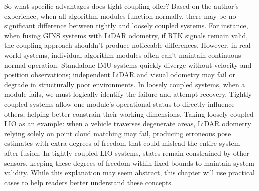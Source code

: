 So what specific advantages does tight coupling offer? Based on the author's experience, when all algorithm modules function normally, there may be no significant difference between tightly and loosely coupled systems. For instance, when fusing GINS systems with LiDAR odometry, if RTK signals remain valid, the coupling approach shouldn't produce noticeable differences. However, in real-world systems, individual algorithm modules often can't maintain continuous normal operation. Standalone IMU systems quickly diverge without velocity and position observations; independent LiDAR and visual odometry may fail or degrade in structurally poor environments. In loosely coupled systems, when a module fails, we must logically identify the failure and attempt recovery. Tightly coupled systems allow one module's operational status to directly influence others, helping better constrain their working dimensions. Taking loosely coupled LIO as an example: when a vehicle traverses degenerate areas, LiDAR odometry relying solely on point cloud matching may fail, producing erroneous pose estimates with extra degrees of freedom that could mislead the entire system after fusion. In tightly coupled LIO systems, states remain constrained by other sensors, keeping these degrees of freedom within fixed bounds to maintain system validity. While this explanation may seem abstract, this chapter will use practical cases to help readers better understand these concepts.
